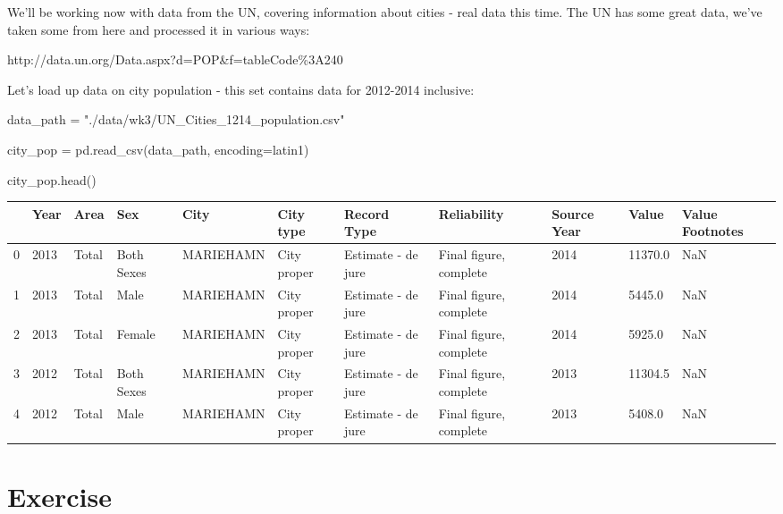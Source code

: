 \documentclass[
  letterpaper,
  DIV=11,
  numbers=noendperiod]{scrreprt}
\newenvironment{Shaded}{\begin{snugshade}}{\end{snugshade}}
\newcommand{\NormalTok}[1]{\textcolor[rgb]{0.00,0.23,0.31}{#1}}
\newcommand{\OperatorTok}[1]{\textcolor[rgb]{0.37,0.37,0.37}{#1}}
\newcommand{\StringTok}[1]{\textcolor[rgb]{0.13,0.47,0.30}{#1}}
\begin{document}
We'll be working now with data from the UN, covering information about
cities - real data this time. The UN has some great data, we've taken
some from here and processed it in various ways:

http://data.un.org/Data.aspx?d=POP\&f=tableCode\%3A240

Let's load up data on city population - this set contains data for
2012-2014 inclusive:

\begin{Shaded}
\begin{Highlighting}[]
\NormalTok{data\_path }\OperatorTok{=} \StringTok{"./data/wk3/UN\_Cities\_1214\_population.csv"}

\NormalTok{city\_pop }\OperatorTok{=}\NormalTok{ pd.read\_csv(data\_path, encoding}\OperatorTok{=}\StringTok{\textquotesingle{}latin1\textquotesingle{}}\NormalTok{)}
\end{Highlighting}
\end{Shaded}

\begin{Shaded}
\begin{Highlighting}[]
\NormalTok{city\_pop.head()}
\end{Highlighting}
\end{Shaded}

\begin{longtable}[]{@{}lllllllllll@{}}
\toprule()
& Year & Area & Sex & City & City type & Record Type & Reliability &
Source Year & Value & Value Footnotes \\
\midrule()
\endhead
0 & 2013 & Total & Both Sexes & MARIEHAMN & City proper & Estimate - de
jure & Final figure, complete & 2014 & 11370.0 & NaN \\
1 & 2013 & Total & Male & MARIEHAMN & City proper & Estimate - de jure &
Final figure, complete & 2014 & 5445.0 & NaN \\
2 & 2013 & Total & Female & MARIEHAMN & City proper & Estimate - de jure
& Final figure, complete & 2014 & 5925.0 & NaN \\
3 & 2012 & Total & Both Sexes & MARIEHAMN & City proper & Estimate - de
jure & Final figure, complete & 2013 & 11304.5 & NaN \\
4 & 2012 & Total & Male & MARIEHAMN & City proper & Estimate - de jure &
Final figure, complete & 2013 & 5408.0 & NaN \\
\bottomrule()
\end{longtable}

\hypertarget{exercise-15}{%
\section{Exercise}\label{exercise-15}}
\end{document}
